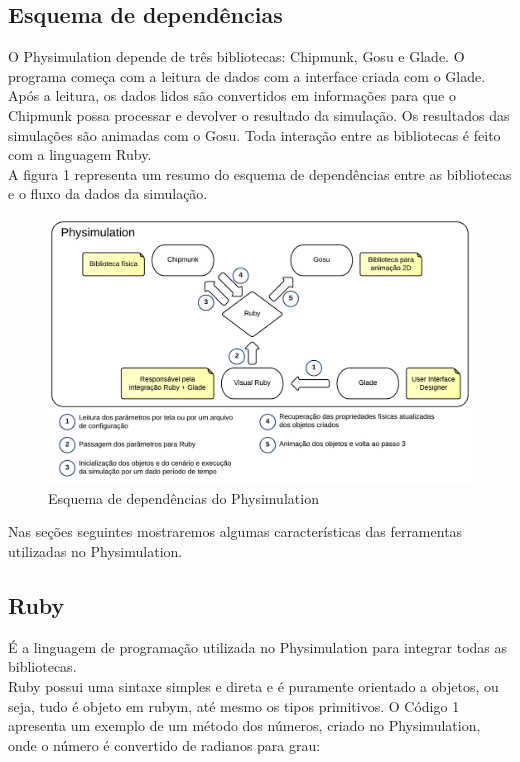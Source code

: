 \subsection{Esquema de dependências}
O Physimulation depende de três bibliotecas: Chipmunk, Gosu e Glade. O programa começa com a leitura de dados com a interface criada com o Glade. Após a leitura, 
os dados lidos são convertidos em informações para que o Chipmunk possa processar e devolver o resultado da simulação. Os resultados das simulações são animadas 
com o Gosu. Toda interação entre as bibliotecas é feito com a linguagem Ruby. \\

A figura 1 representa um resumo do esquema de dependências entre as bibliotecas e o fluxo da dados da simulação.

\begin{figure}[!htbp]
  \includegraphics[scale=0.2]{EsquemaDependencia.png}
  \caption{Esquema de dependências do Physimulation}
\end{figure}

Nas seções seguintes mostraremos algumas características das ferramentas utilizadas no Physimulation.

\subsection{Ruby}
É a linguagem de programação utilizada no Physimulation para integrar todas as bibliotecas.\\

Ruby possui uma sintaxe simples e direta e é puramente orientado a objetos, ou seja, tudo é objeto em rubym, até mesmo os tipos primitivos. O Código 1 apresenta um exemplo de um método dos números, criado no Physimulation, onde o 
número é convertido de radianos para grau:

